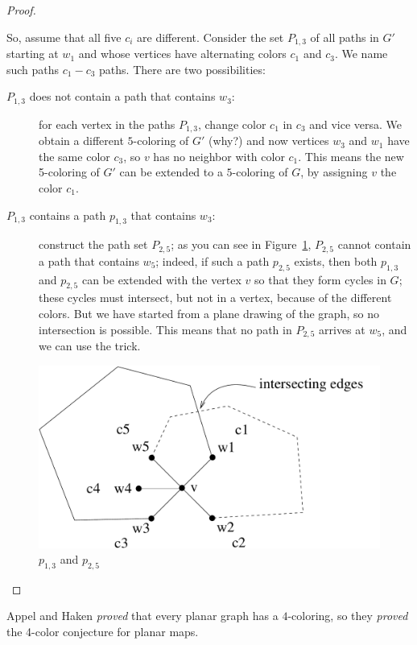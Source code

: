 \begin{proof}
{\begin{description}
So, assume that all five $c_{i}$ are different. Consider the set
$P_{1,3}$ of all paths in $G'$ starting at $w_{1}$ and whose vertices
have alternating colors $c_{1}$ and $c_{3}$. We name such paths
$c_{1}-c_{3}$ paths.  There are two possibilities:

\begin{description}
\item[$P_{1,3}$ does not contain a path that contains $w_{3}$:]
  for each vertex in the paths $P_{1,3}$, change color $c_{1}$ in
  $c_{3}$ and vice versa. We obtain a different $5$-coloring of $G'$
  (why?) and now vertices $w_{3}$ and $w_{1}$ have the same color
  $c_{3}$, so $v$ has no neighbor with color $c_{1}$. This means the
  new 5-coloring of $G'$ can be extended to a $5$-coloring of $G$, by
  assigning $v$ the color $c_{1}$.

\item[$P_{1,3}$ contains a path $p_{1,3}$ that contains $w_{3}$:]
  construct the path set $P_{2,5}$; as you can see in
  Figure~\ref{5kleuring3}, $P_{2,5}$ cannot contain a path that
  contains $w_{5}$; indeed, if such a path $p_{2,5}$ exists, then both
  $p_{1,3}$ and $p_{2,5}$ can be extended with the vertex $v$ so that
  they form cycles in $G$; these cycles must intersect, but not in a
  vertex, because of the different colors. But we have started from a
  plane drawing of the graph, so no intersection is possible. This
  means that no path in $P_{2,5}$ arrives at $w_{5}$, and we can use
  the trick.
\end{description}

\begin{figure}[ht]
	\centering
	\includegraphics[width=0.4\linewidth,keepaspectratio]{5kleuring3eng}
	\caption{$p_{1,3}$ and $p_{2,5}$ \label{5kleuring3}}
\end{figure}
\end{description}
}
\end{proof}

Appel and Haken {\em proved} that every planar graph has a
$4$-coloring, so they {\em proved} the 4-color conjecture for planar
maps.

